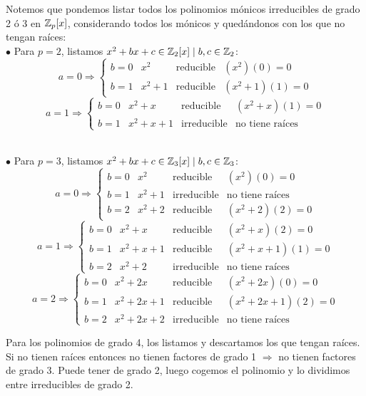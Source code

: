 \bigskip

Notemos que pondemos listar todos los polinomios mónicos irreducibles de grado 2 ó 3 en $\mathbb Z_p[x]$, considerando todos
los mónicos y quedándonos con los que no tengan raíces:\\


$\bullet$ Para $p=2$, listamos $x^2+bx+c \in \mathbb Z_2[x] \mid b,c \in \mathbb Z_2$:
$$a=0 \Rightarrow \left\{ \begin{array}{llll}
        b=0 & x^2   & \mbox{reducible} & (x^2)(0)=0   \\
        b=1 & x^2+1 & \mbox{reducible} & (x^2+1)(1)=0
    \end{array} \right.$$
$$a=1 \Rightarrow \left\{ \begin{array}{llll}
        b=0 & x^2+x   & \mbox{reducible}   & (x^2+x)(1)=0           \\
        b=1 & x^2+x+1 & \mbox{irreducible} & \mbox{no tiene raíces}
    \end{array} \right.$$

\ \\

$\bullet$ Para $p=3$, listamos $x^2+bx+c \in \mathbb Z_3[x] \mid b,c \in \mathbb Z_3$:
$$a=0 \Rightarrow \left\{ \begin{array}{llll}
        b=0 & x^2   & \mbox{reducible}   & (x^2)(0) = 0           \\
        b=1 & x^2+1 & \mbox{irreducible} & \mbox{no tiene raíces} \\
        b=2 & x^2+2 & \mbox{reducible}   & (x^2+2)(2)=0
    \end{array} \right.$$
$$a=1 \Rightarrow \left\{ \begin{array}{llll}
        b=0 & x^2+x   & \mbox{reducible}   & (x^2+x)(2) = 0         \\
        b=1 & x^2+x+1 & \mbox{reducible}   & (x^2+x+1)(1)=0         \\
        b=2 & x^2+2   & \mbox{irreducible} & \mbox{no tiene raíces}
    \end{array} \right.$$
$$a=2 \Rightarrow \left\{ \begin{array}{llll}
        b=0 & x^2+2x   & \mbox{reducible}   & (x^2+2x)(0) = 0        \\
        b=1 & x^2+2x+1 & \mbox{reducible}   & (x^2+2x+1)(2)=0        \\
        b=2 & x^2+2x+2 & \mbox{irreducible} & \mbox{no tiene raíces}
    \end{array} \right.$$
\bigskip

Para los polinomios de grado 4, los listamos y descartamos los que tengan raíces. Si no tienen raíces entonces no tienen
factores de grado 1 $\Rightarrow$ no tienen factores de grado 3.\newline
Puede tener de grado 2, luego cogemos el polinomio y lo dividimos entre irreducibles de grado 2.

